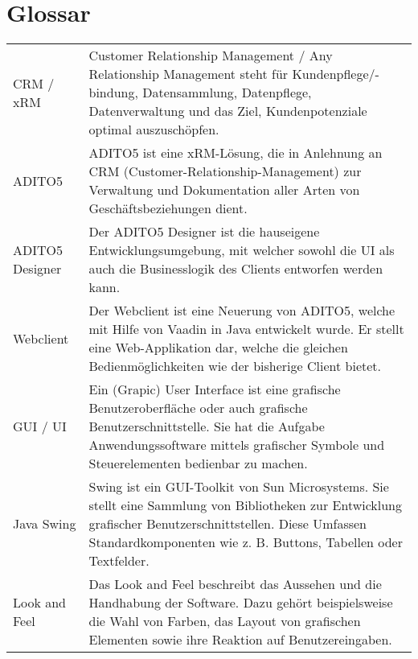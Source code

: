 \section{Glossar}
\begin{center}
	\begin{tabularx}{\textwidth}{p{}|X}
	    CRM / xRM & 
		Customer Relationship Management / Any Relationship Management
	  	steht für Kundenpflege/-bindung, Datensammlung, Datenpflege, Datenverwaltung und das Ziel, Kundenpotenziale optimal auszuschöpfen. \\ 
	  	ADITO5 &
	  	ADITO5 ist eine xRM-Lösung, die in Anlehnung an CRM (Customer-Relationship-Management)
	  	zur Verwaltung und Dokumentation aller Arten von Geschäftsbeziehungen dient. \\
	  	ADITO5 Designer &
	  	Der ADITO5 Designer ist die hauseigene Entwicklungsumgebung, mit welcher sowohl die UI als
	  	auch die Businesslogik des Clients entworfen werden kann. \\
	  	Webclient &
	  	Der Webclient ist eine Neuerung von ADITO5, welche mit Hilfe von Vaadin in Java entwickelt wurde. Er stellt eine Web-Applikation dar, welche die gleichen Bedienmöglichkeiten wie der bisherige Client bietet. \\
	  	GUI / UI &
	  	Ein (Grapic) User Interface ist eine grafische Benutzeroberfläche oder auch grafische Benutzerschnittstelle. Sie hat die Aufgabe Anwendungssoftware mittels grafischer Symbole und Steuerelementen bedienbar zu machen. \\
	  	Java Swing &
	  	Swing ist ein GUI-Toolkit von Sun Microsystems. Sie stellt eine Sammlung von Bibliotheken zur Entwicklung grafischer Benutzerschnittstellen. Diese Umfassen Standardkomponenten wie z. B. Buttons, Tabellen oder Textfelder. \\
	  	
	  	Look and Feel &
	  	Das Look and Feel beschreibt das Aussehen und die Handhabung der Software. Dazu gehört beispielsweise die Wahl von Farben, das Layout von grafischen Elementen sowie ihre Reaktion auf Benutzereingaben.
	  	 \\
	\end{tabularx}
\end{center}